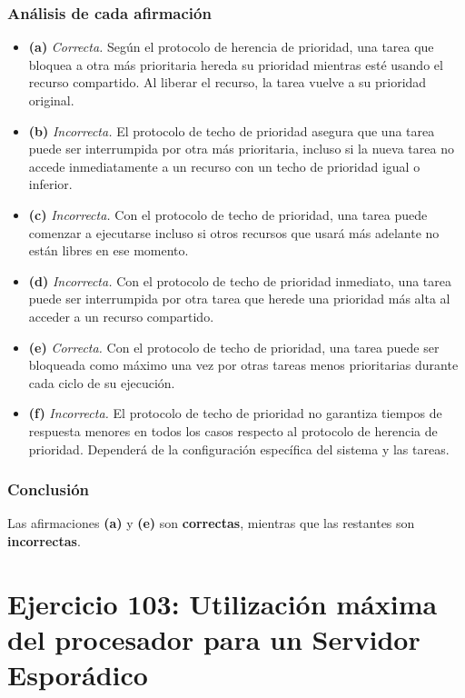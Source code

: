 \documentclass[a4paper,12pt]{article}
\begin{document}
\subsubsection{Análisis de cada afirmación}
\begin{itemize}
    \item \textbf{(a)} \textit{Correcta.} 
    Según el protocolo de herencia de prioridad, una tarea que bloquea a otra más prioritaria hereda su prioridad mientras esté usando el recurso compartido. Al liberar el recurso, la tarea vuelve a su prioridad original.

    \item \textbf{(b)} \textit{Incorrecta.} 
    El protocolo de techo de prioridad asegura que una tarea puede ser interrumpida por otra más prioritaria, incluso si la nueva tarea no accede inmediatamente a un recurso con un techo de prioridad igual o inferior.

    \item \textbf{(c)} \textit{Incorrecta.} 
    Con el protocolo de techo de prioridad, una tarea puede comenzar a ejecutarse incluso si otros recursos que usará más adelante no están libres en ese momento.

    \item \textbf{(d)} \textit{Incorrecta.} 
    Con el protocolo de techo de prioridad inmediato, una tarea puede ser interrumpida por otra tarea que herede una prioridad más alta al acceder a un recurso compartido.

    \item \textbf{(e)} \textit{Correcta.} 
    Con el protocolo de techo de prioridad, una tarea puede ser bloqueada como máximo una vez por otras tareas menos prioritarias durante cada ciclo de su ejecución.

    \item \textbf{(f)} \textit{Incorrecta.} 
    El protocolo de techo de prioridad no garantiza tiempos de respuesta menores en todos los casos respecto al protocolo de herencia de prioridad. Dependerá de la configuración específica del sistema y las tareas.
\end{itemize}

\subsubsection{Conclusión}
Las afirmaciones \textbf{(a)} y \textbf{(e)} son \textbf{correctas}, mientras que las restantes son \textbf{incorrectas}.

\section{Ejercicio 103: Utilización máxima del procesador para un Servidor Esporádico}
\end{document}
